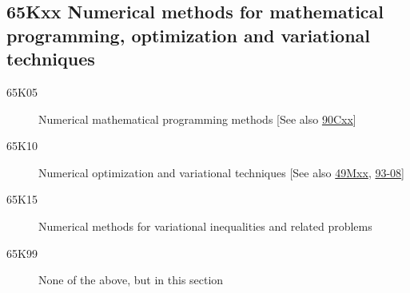 \subsection*{65Kxx Numerical methods for mathematical programming, optimization and variational techniques}\label{65Kxx}
\begin{description}  
\item [65K05]\label{65K05} Numerical mathematical programming methods [See also \hyperref[90Cxx]{90Cxx}]
\item [65K10]\label{65K10} Numerical optimization and variational techniques [See also \hyperref[49Mxx]{49Mxx}, \hyperref[93-08]{93-08}]
\item [65K15]\label{65K15} Numerical methods for variational inequalities and related problems
\item [65K99]\label{65K99} None of the above, but in this section
\end{description}
